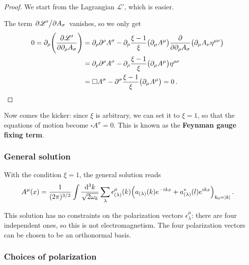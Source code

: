 \documentclass[main.tex]{subfiles}
\begin{document}
\begin{proof}
We start from the Lagrangian \(\mathscr{L}'\), which is easier. 

The term \(\pdv*{\mathscr{L}'}{A_{\sigma }}\) vanishes, so we only get 
%
\begin{subequations}
\begin{align}
0=\partial_{\rho } \qty(\pdv{\mathscr{L}'}{\partial_{\rho } A_{\sigma }}) 
&= \partial_{\rho } \partial^{\rho } A^{\sigma } - \partial_{\rho } 
\frac{\xi - 1}{\xi } \qty(\partial_{\mu } A^{\mu }) \pdv{}{\partial_{\rho } A_{\sigma }} \qty(\partial_{\mu } A_{\nu } \eta^{\mu \nu })  \\
&= \partial_{\rho } \partial^{\rho } A^{\sigma } - \partial_{\rho } 
\frac{\xi - 1}{\xi } \qty(\partial_{\mu } A^{\mu }) \eta^{\rho \sigma }  \\
&= \square A^{\sigma } - \partial^{\sigma } 
\frac{\xi - 1}{\xi } \qty(\partial_{\mu } A^{\mu }) =0
\,. 
\end{align}
\end{subequations}
\end{proof}

Now comes the kicker: since \(\xi \) is arbitrary, we can set it to \(\xi = 1\), so that the equations of motion become \(\square A^{\sigma } = 0\). This is known as the \textbf{Feynman gauge fixing term}.

\subsubsection{General solution}

With the condition \(\xi = 1\), the general solution reads 
%
\begin{align}
A^{\mu } (x) = \frac{1}{(2\pi )^{3/2}} \int \frac{ \dd[3]{k}}{\sqrt{2 \omega_{k}}} 
\sum _{\lambda } \epsilon^{\mu }_{(\lambda )}(k)
\qty(a_{(\lambda )}(k) e^{-ikx} + a^{*}_{(\lambda )} (l) e^{ikx})_{k_0 = \abs{k}}
\,.
\end{align}

This solution has no constraints on the polarization vectors \(\epsilon^{\mu }_{\lambda }\): there are four independent ones, so this is not electromagnetism. 
The four polarization vectors can be chosen to be an orthonormal basis. 

\subsubsection{Choices of polarization}
\end{document}
